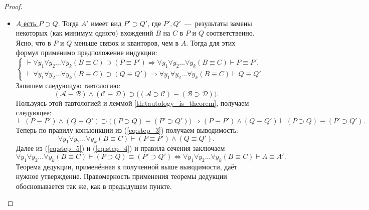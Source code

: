 \begin{proof}
\begin{itemize}
        \item \underline{$A$ есть $P \supset Q$}. Тогда $A'$ имеет вид $P' \supset Q'$, где $P', Q'$~---~результаты замены некоторых (как минимум одного) вхождений $B$ на $C$ в $P$ и $Q$ соответственно. Ясно, что в $P$ и $Q$ меньше связок и кванторов, чем в $A$. Тогда для этих формул применимо предположение индукции:
        \begin{equation}\label{eq:step_3}
            \begin{cases}
                \vdash \forall y_1\forall y_2\dots\forall y_k(B \equiv C) \supset (P \equiv P') \Longrightarrow \forall y_1\forall y_2\dots\forall y_k(B \equiv C) \vdash P \equiv P', \\
                \vdash \forall y_1\forall y_2\dots\forall y_k(B \equiv C) \supset (Q \equiv Q') \Longrightarrow \forall y_1\forall y_2\dots\forall y_k(B \equiv C) \vdash Q \equiv Q'.
            \end{cases}
        \end{equation}
        Запишем следующую тавтологию:
        \[
            (\mathcal{A} \equiv \mathcal{B}) \land (\mathcal{C} \equiv \mathcal{D}) \supset \big((\mathcal{A} \supset \mathcal{C}) \equiv (\mathcal{B} \supset \mathcal{D})\big).
        \]
        Пользуясь этой тавтологией и леммой \ref{th:tautology_is_theorem}, получаем следующее:
        \begin{equation}\label{eq:step_4}
            \vdash (P \equiv P') \land (Q \equiv Q') \supset \big((P \supset Q) \equiv (P' \supset Q')\big) \Longrightarrow (P \equiv P') \land (Q \equiv Q') \vdash (P \supset Q) \equiv (P' \supset Q').
        \end{equation}
        Теперь по правилу конъюнкции из (\ref{eq:step_3}) получаем выводимость:
        \begin{equation}\label{eq:step_5}
            \forall y_1\forall y_2\dots\forall y_k(B \equiv C) \vdash (P \equiv P') \land (Q \equiv Q').
        \end{equation}
        Далее из (\ref{eq:step_5}) и (\ref{eq:step_4}) и правила сечения заключаем
        \[
            \forall y_1\forall y_2\dots\forall y_k(B \equiv C) \vdash (P \supset Q) \equiv (P' \supset Q') \Longleftrightarrow \forall y_1\forall y_2\dots\forall y_k(B \equiv C) \vdash A \equiv A'.
        \]
        Теорема дедукции, применённая к полученной выше выводимости, даёт нужное утверждение. Правомерность применения теоремы дедукции обосновывается так же, как в предыдущем пункте.


\end{itemize}
\end{proof}
